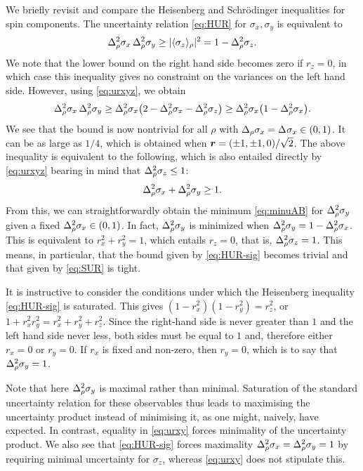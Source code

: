 We briefly revisit and compare the Heisenberg and Schr\"odinger inequalities for spin components.
The uncertainty relation \eqref{eq:HUR} for $\sigma_x,\sigma_y$ is equivalent to
\begin{equation}\label{eq:HUR-sig}
  \varr{\sigma_x}\,\varr{\sigma_y}\ge |\langle \sigma_z\rangle_\rho|^2=1-\varr{\sigma_z}.
\end{equation}
We note that the lower bound on the right hand side becomes zero if $r_z=0$, in which case this inequality gives no constraint on the variances on the left hand side. However, using  \eqref{eq:urxyz}, we obtain
\begin{equation}\label{eq:prodbd}
  \varr{\sigma_x}\,\varr{\sigma_y}\ge\varr{\sigma_x}\bigl(2-\varr{\sigma_x}-\varr{\sigma_z}\bigr)\ge\varr{\sigma_x}\bigl(1-\varr{\sigma_x}\bigr).
\end{equation}
We see that the bound is now nontrivial for all $\rho$ with $\sdevr{\sigma_x}=\sdev{\sigma_x}\in(0,1)$. It can be as large as $1/4$, which is obtained when $\bm{r}=(\pm1,\pm1,0)/\sqrt2$. The above inequality is equivalent to the following, which is also entailed directly by \eqref{eq:urxyz} bearing in mind that $\varr{\sigma_z}\le 1$:
\begin{equation}\label{eq:urxy}
  \varr{\sigma_x}+\varr{\sigma_y}\ge 1.
\end{equation}
From this, we can straightforwardly obtain the minimum \eqref{eq:minuAB} for $\varr{\sigma_y}$ given a fixed $\varr{\sigma_x}\in(0,1)$.
In fact, $\varr{\sigma_y}$ is minimized  when $\varr{\sigma_y}=1-\varr{\sigma_x}$. This is equivalent to $r_x^2+r_y^2=1$, which entails $r_z=0$, that is, $\varr{\sigma_z}=1$. This means, in particular, that  the bound given by \eqref{eq:HUR-sig} becomes trivial and that given by \eqref{eq:SUR} is tight.

It is instructive to consider the conditions under which the Heisenberg inequality \eqref{eq:HUR-sig} is saturated. This gives
$(1-r_x^2)(1-r_y^2)=r_z^2$, or $1+r_x^2r_y^2=r_x^2+r_y^2+r_z^2$. Since the right-hand side is never greater than $1$ and the left hand side never less, both sides must be equal to $1$ and, therefore either $r_x=0$ or $r_y=0$. If $r_x$ is fixed and  non-zero, then $r_y=0$, which is to say that $\varr{\sigma_y}=1$.

Note that here $\varr{\sigma_y}$  is maximal rather than minimal. Saturation of the standard uncertainty relation for these observables thus leads to maximising the uncertainty product instead of minimising it, as one might, naively, have expected. In contrast, equality in \eqref{eq:urxy} forces minimality of the uncertainty product. We also see that \eqref{eq:HUR-sig} forces maximality $\varr{\sigma_x}=\varr{\sigma_y}=1$ by requiring minimal uncertainty for $\sigma_z$, whereas \eqref{eq:urxy} does not stipulate this.

